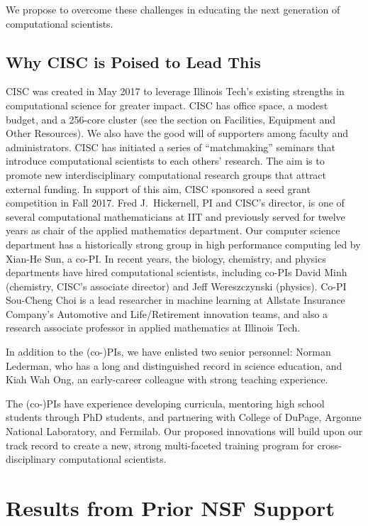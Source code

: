 \documentclass[11pt]{NSFamsart}
\begin{document}
We propose to overcome these challenges in educating the next generation of computational scientists.

\subsection*{Why CISC is Poised to Lead This}
CISC was created in May 2017 to leverage Illinois Tech's existing strengths in computational science for greater impact.  CISC has office space, a modest budget, and a 256-core cluster (see the section on Facilities, Equipment and Other Resources).  We also have the good will of supporters among faculty and administrators.  CISC has initiated a series of  ``matchmaking'' seminars that introduce computational scientists to each others' research.  The aim is to promote new interdisciplinary computational research groups that attract external funding. In support of this aim, CISC sponsored a seed grant competition in Fall 2017. Fred J.~Hickernell, PI and CISC’s director, is one of several computational mathematicians at IIT and previously served for twelve years as chair of the applied mathematics department.  Our computer science department has a historically strong group in high performance computing led by Xian-He Sun, a co-PI.  In recent years, the biology, chemistry, and physics departments have hired computational scientists, including co-PIs David Minh (chemistry, CISC's associate director) and Jeff Wereszczynski (physics).  Co-PI Sou-Cheng Choi is a lead researcher in machine learning at Allstate Insurance Company's Automotive and Life/Retirement innovation teams, and also a research associate professor in applied mathematics at Illinois Tech.

In addition to the (co-)PIs, we have enlisted two senior personnel:  Norman Lederman, who has a long and distinguished record in science education, and Kiah Wah Ong, an early-career colleague with strong teaching experience.

The (co-)PIs have experience developing curricula, mentoring high school students through PhD students, and partnering with College of DuPage, Argonne National Laboratory, and Fermilab.  Our proposed innovations will build upon our track record to create a new, strong multi-faceted training program for cross-disciplinary computational scientists.

\section{Results from Prior NSF Support}
\end{document}
